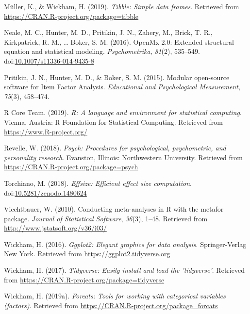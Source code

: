 \documentclass[man]{apa6}
\begin{document}
\leavevmode\hypertarget{ref-R-tibble}{}%
Müller, K., \& Wickham, H. (2019). \emph{Tibble: Simple data frames}. Retrieved from \url{https://CRAN.R-project.org/package=tibble}

\leavevmode\hypertarget{ref-R-OpenMx_a}{}%
Neale, M. C., Hunter, M. D., Pritikin, J. N., Zahery, M., Brick, T. R., Kirkpatrick, R. M., \ldots{} Boker, S. M. (2016). OpenMx 2.0: Extended structural equation and statistical modeling. \emph{Psychometrika}, \emph{81}(2), 535--549. doi:\href{https://doi.org/10.1007/s11336-014-9435-8}{10.1007/s11336-014-9435-8}

\leavevmode\hypertarget{ref-R-OpenMx_b}{}%
Pritikin, J. N., Hunter, M. D., \& Boker, S. M. (2015). Modular open-source software for Item Factor Analysis. \emph{Educational and Psychological Measurement}, \emph{75}(3), 458--474.

\leavevmode\hypertarget{ref-R-base}{}%
R Core Team. (2019). \emph{R: A language and environment for statistical computing}. Vienna, Austria: R Foundation for Statistical Computing. Retrieved from \url{https://www.R-project.org/}

\leavevmode\hypertarget{ref-R-psych}{}%
Revelle, W. (2018). \emph{Psych: Procedures for psychological, psychometric, and personality research}. Evanston, Illinois: Northwestern University. Retrieved from \url{https://CRAN.R-project.org/package=psych}

\leavevmode\hypertarget{ref-R-effsize}{}%
Torchiano, M. (2018). \emph{Effsize: Efficient effect size computation}. doi:\href{https://doi.org/10.5281/zenodo.1480624}{10.5281/zenodo.1480624}

\leavevmode\hypertarget{ref-R-metafor}{}%
Viechtbauer, W. (2010). Conducting meta-analyses in R with the metafor package. \emph{Journal of Statistical Software}, \emph{36}(3), 1--48. Retrieved from \url{http://www.jstatsoft.org/v36/i03/}

\leavevmode\hypertarget{ref-R-ggplot2}{}%
Wickham, H. (2016). \emph{Ggplot2: Elegant graphics for data analysis}. Springer-Verlag New York. Retrieved from \url{https://ggplot2.tidyverse.org}

\leavevmode\hypertarget{ref-R-tidyverse}{}%
Wickham, H. (2017). \emph{Tidyverse: Easily install and load the 'tidyverse'}. Retrieved from \url{https://CRAN.R-project.org/package=tidyverse}

\leavevmode\hypertarget{ref-R-forcats}{}%
Wickham, H. (2019a). \emph{Forcats: Tools for working with categorical variables (factors)}. Retrieved from \url{https://CRAN.R-project.org/package=forcats}
\end{document}
